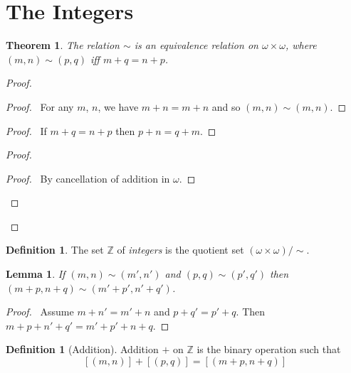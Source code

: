 \documentclass{report}
\let\qed\relax
\newtheorem{lemma}[axiom]{Lemma}
\newtheorem{theorem}[axiom]{Theorem}
\theoremstyle{definition}
\newtheorem{definition}[axiom]{Definition}
\begin{document}
    \section{The Integers}

    \begin{theorem}
        The relation $\sim$ is an equivalence relation on $\omega \times \omega$, where $(m,n) \sim (p,q)$ iff
        $m + q = n + p$.
    \end{theorem}

    \begin{proof}
        \pf
        \begin{proof}
            \pf\ For any $m$, $n$, we have $m + n = m + n$ and so $(m,n) \sim (m,n)$.
        \end{proof}
        \begin{proof}
            \pf\ If $m + q = n + p$ then $p + n = q + m$.
        \end{proof}
        \begin{proof}
            \begin{proof}
                \pf\ By cancellation of addition in $\omega$.
            \end{proof}
        \end{proof}
        \qed
    \end{proof}

    \begin{definition}
        The set $\mathbb{Z}$ of \emph{integers} is the quotient set $(\omega \times \omega) / \sim$.
    \end{definition}

    \begin{lemma}
        If $(m,n) \sim (m',n')$ and $(p,q) \sim (p',q')$ then $(m+p,n+q) \sim (m'+p',n'+q')$.
    \end{lemma}

    \begin{proof}
        \pf\ Assume $m + n' = m' + n$ and $p + q' = p' + q$. Then $m + p + n' + q' = m' + p' + n + q$. \qed
    \end{proof}

    \begin{definition}[Addition]
        Addition $+$ on $\mathbb{Z}$ is the binary operation such that
        \[ [(m,n)] + [(p,q)] = [(m+p,n+q)] \]
    \end{definition}
\end{document}
